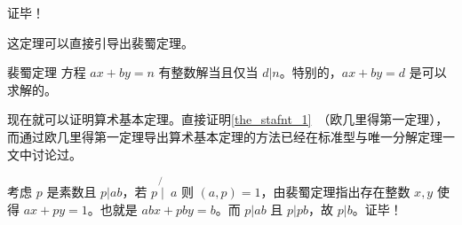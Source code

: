 证毕！

这定理可以直接引导出裴蜀定理。
\begin{theorem}{裴蜀定理}
方程 $ax + by = n$ 有整数解当且仅当 $d | n$。特别的，$ax+by = d$ 是可以求解的。
\end{theorem}

现在就可以证明算术基本定理。直接证明\autoref{the_stafnt_1}~（欧几里得第一定理），而通过欧几里得第一定理导出算术基本定理的方法已经在标准型与唯一分解定理一文中讨论过。

考虑 $p$ 是素数且 $p|ab$，若 $p \not{\mid} ~ a$ 则 $(a, p) =1 $，由裴蜀定理指出存在整数 $x, y$ 使得 $ax+py = 1$。也就是 $abx + pby = b$。而 $p | ab$ 且 $p | pb$，故 $p | b$。证毕！